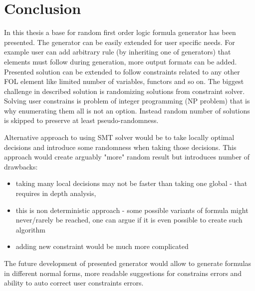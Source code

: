 \chapter{Conclusion}

In this thesis a base for random first order logic formula generator has been presented. The generator can be easily extended for user specific needs. For example user can add arbitrary rule (by inheriting one of generators) that elements must follow during generation, more output formats can be added.
Presented solution can be extended to follow constraints related to any other \gls{FOL} element like limited number of variables, functors and so on.
The biggest challenge in described solution is randomizing solutions from constraint solver. Solving user constrains is problem of integer programming (NP problem) that is why enumerating them all is not an option. Instead random number of solutions is skipped to preserve at least pseudo-randomness.

Alternative approach to using \gls{SMT} solver would be to take locally optimal decisions and introduce some randomness when taking those decisions. This approach would create arguably "more" random result but introduces number of drawbacks:

\begin{itemize}
  \item taking many local decisions may not be faster than taking one global - that requires in depth analysis,
  \item this is non deterministic approach - some possible variants of formula might never/rarely be reached, one can argue if it is even possible to create such algorithm
  \item adding new constraint would be much more complicated
\end{itemize}

The future development of presented generator would allow to generate formulas in different normal forms, more readable suggestions for constrains errors and ability to auto correct user constraints errors.
